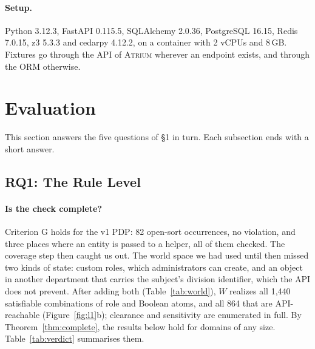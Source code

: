 \documentclass[sigconf,review,anonymous]{acmart}
\newcommand{\sysname}{\textsc{Atrium}\xspace}
\newcommand{\sysname}{\textsc{OpenZTAC}\xspace}
\begin{document}
\paragraph{Setup.} Python 3.12.3, FastAPI 0.115.5, SQLAlchemy 2.0.36, PostgreSQL 16.15, Redis 7.0.15, z3
5.3.3 and cedarpy 4.12.2, on a container with 2 vCPUs and 8\,GB. Fixtures go through the API of \sysname
wherever an endpoint exists, and through the ORM otherwise.

\section{Evaluation}
\label{sec:eval}

This section answers the five questions of \S1 in turn. Each subsection ends with a short answer.

\subsection{RQ1: The Rule Level}
\label{sec:l1}

\paragraph{Is the check complete?} Criterion G holds for the v1 PDP: 82 open-sort occurrences, no violation,
and three places where an entity is passed to a helper, all of them checked. The coverage step then caught us
out. The world space we had used until then missed two kinds of state: custom roles, which administrators can
create, and an object in another department that carries the subject's division identifier, which the API does
not prevent. After adding both (Table~\ref{tab:world}), $W$ realizes all 1{,}440 satisfiable combinations of
role and Boolean atoms, and all 864 that are API-reachable (Figure~\ref{fig:l1}b); clearance and sensitivity
are enumerated in full. By Theorem~\ref{thm:complete}, the results below hold for domains of any size.
Table~\ref{tab:verdict} summarises them.
\end{document}

